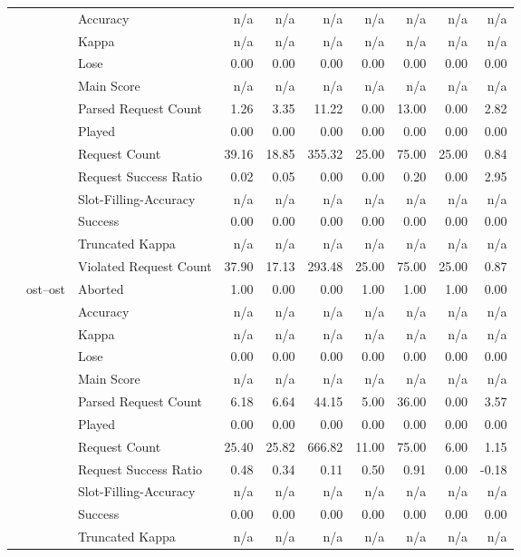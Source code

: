 \begin{tabular}{lllrrrrrrr}
 &  & Accuracy & n/a & n/a & n/a & n/a & n/a & n/a & n/a \\
 &  & Kappa & n/a & n/a & n/a & n/a & n/a & n/a & n/a \\
 &  & Lose & 0.00 & 0.00 & 0.00 & 0.00 & 0.00 & 0.00 & 0.00 \\
 &  & Main Score & n/a & n/a & n/a & n/a & n/a & n/a & n/a \\
 &  & Parsed Request Count & 1.26 & 3.35 & 11.22 & 0.00 & 13.00 & 0.00 & 2.82 \\
 &  & Played & 0.00 & 0.00 & 0.00 & 0.00 & 0.00 & 0.00 & 0.00 \\
 &  & Request Count & 39.16 & 18.85 & 355.32 & 25.00 & 75.00 & 25.00 & 0.84 \\
 &  & Request Success Ratio & 0.02 & 0.05 & 0.00 & 0.00 & 0.20 & 0.00 & 2.95 \\
 &  & Slot-Filling-Accuracy & n/a & n/a & n/a & n/a & n/a & n/a & n/a \\
 &  & Success & 0.00 & 0.00 & 0.00 & 0.00 & 0.00 & 0.00 & 0.00 \\
 &  & Truncated Kappa & n/a & n/a & n/a & n/a & n/a & n/a & n/a \\
 &  & Violated Request Count & 37.90 & 17.13 & 293.48 & 25.00 & 75.00 & 25.00 & 0.87 \\
\cline{2-10}
 & \multirow[t]{13}{*}{ost--ost} & Aborted & 1.00 & 0.00 & 0.00 & 1.00 & 1.00 & 1.00 & 0.00 \\
 &  & Accuracy & n/a & n/a & n/a & n/a & n/a & n/a & n/a \\
 &  & Kappa & n/a & n/a & n/a & n/a & n/a & n/a & n/a \\
 &  & Lose & 0.00 & 0.00 & 0.00 & 0.00 & 0.00 & 0.00 & 0.00 \\
 &  & Main Score & n/a & n/a & n/a & n/a & n/a & n/a & n/a \\
 &  & Parsed Request Count & 6.18 & 6.64 & 44.15 & 5.00 & 36.00 & 0.00 & 3.57 \\
 &  & Played & 0.00 & 0.00 & 0.00 & 0.00 & 0.00 & 0.00 & 0.00 \\
 &  & Request Count & 25.40 & 25.82 & 666.82 & 11.00 & 75.00 & 6.00 & 1.15 \\
 &  & Request Success Ratio & 0.48 & 0.34 & 0.11 & 0.50 & 0.91 & 0.00 & -0.18 \\
 &  & Slot-Filling-Accuracy & n/a & n/a & n/a & n/a & n/a & n/a & n/a \\
 &  & Success & 0.00 & 0.00 & 0.00 & 0.00 & 0.00 & 0.00 & 0.00 \\
 &  & Truncated Kappa & n/a & n/a & n/a & n/a & n/a & n/a & n/a \\

\end{tabular}
